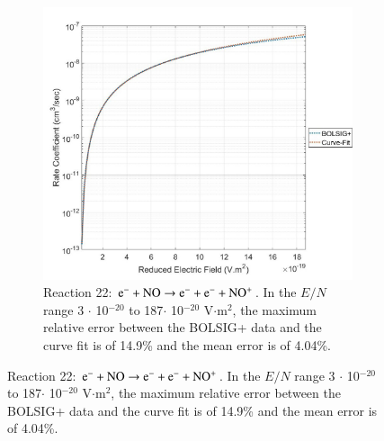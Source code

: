 \documentclass{warpdoc}
\begin{document}
\begin{figure}[!t]
  \centering
        \begin{subfigure}{0.49\textwidth}
            \includegraphics[width=0.99\linewidth]{NO_1.jpg}
            \caption{ Reaction 22: $\rm e^- + NO   \rightarrow e^- + e^- + NO^+ $. In the $E/N$ range 3 $\cdot$ 10$^{-20}$ to 187$\cdot$ 10$^{-20}$ V$\cdot$m$^2$, the maximum relative error between the BOLSIG+ data and the curve fit is of 14.9\% and the mean error is of 4.04\%.}
        \end{subfigure}

\end{figure}









\end{document}
